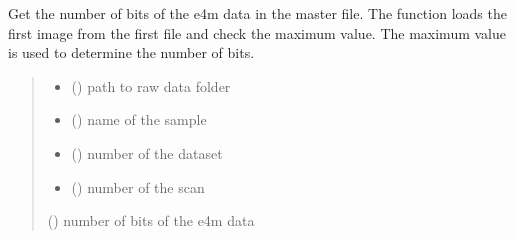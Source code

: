 \documentclass[letterpaper,10pt,english]{sphinxmanual}
\begin{document}

\begin{fulllineitems}
\label{\detokenize{index:ID10_tools.get_Nbit_v1}}
\pysigstartsignatures
\pysiglinewithargsret
{}
{\sphinxparamcomma {}\sphinxparamcomma {}\sphinxparamcomma {}}
{}
\pysigstopsignatures
\sphinxAtStartPar
Get the number of bits of the e4m data in the master file.
The function loads the first image from the first file and check the maximum value.
The maximum value is used to determine the number of bits.
\begin{quote}\begin{description}
\begin{itemize}
\item {} 
\sphinxAtStartPar
{} () \textendash{} path to raw data folder

\item {} 
\sphinxAtStartPar
{} () \textendash{} name of the sample

\item {} 
\sphinxAtStartPar
{} () \textendash{} number of the dataset

\item {} 
\sphinxAtStartPar
{} () \textendash{} number of the scan

\end{itemize}

\sphinxAtStartPar
{} () \textendash{} number of bits of the e4m data

\end{description}\end{quote}

\end{fulllineitems}

\end{document}

